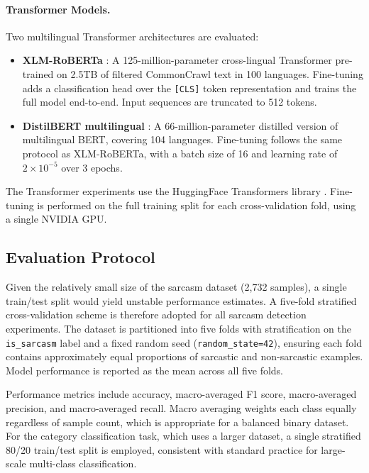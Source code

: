 \documentclass[12pt,a4paper]{article}
\begin{document}
\paragraph{Transformer Models.}
Two multilingual Transformer architectures are evaluated:

\begin{itemize}[itemsep=0.2em]
    \item \textbf{XLM-RoBERTa} \citep{conneau2020unsupervised}: A 125-million-parameter cross-lingual Transformer pre-trained on 2.5TB of filtered CommonCrawl text in 100 languages. Fine-tuning adds a classification head over the \texttt{[CLS]} token representation and trains the full model end-to-end. Input sequences are truncated to 512 tokens.
    \item \textbf{DistilBERT multilingual} \citep{sanh2019distilbert}: A 66-million-parameter distilled version of multilingual BERT, covering 104 languages. Fine-tuning follows the same protocol as XLM-RoBERTa, with a batch size of 16 and learning rate of $2\times10^{-5}$ over 3 epochs.
\end{itemize}

The Transformer experiments use the HuggingFace Transformers library \citep{wolf2020transformers}. Fine-tuning is performed on the full training split for each cross-validation fold, using a single NVIDIA GPU.

\subsection{Evaluation Protocol}
\label{subsec:evaluation}

Given the relatively small size of the sarcasm dataset (2,732 samples), a single train/test split would yield unstable performance estimates. A five-fold stratified cross-validation scheme is therefore adopted for all sarcasm detection experiments. The dataset is partitioned into five folds with stratification on the \texttt{is\_sarcasm} label and a fixed random seed (\texttt{random\_state=42}), ensuring each fold contains approximately equal proportions of sarcastic and non-sarcastic examples. Model performance is reported as the mean across all five folds.

Performance metrics include accuracy, macro-averaged F1 score, macro-averaged precision, and macro-averaged recall. Macro averaging weights each class equally regardless of sample count, which is appropriate for a balanced binary dataset. For the category classification task, which uses a larger dataset, a single stratified 80/20 train/test split is employed, consistent with standard practice for large-scale multi-class classification.
\end{document}
